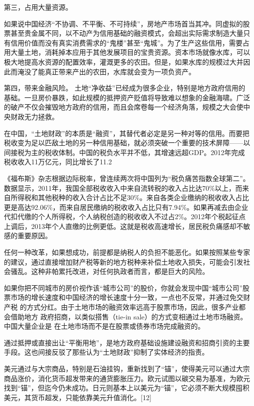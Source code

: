 第三，占用大量资源。

如果说中国经济“不协调、不平衡、不可持续”，房地产市场首当其冲。同虚拟的股票甚至贵金属不同，以不动产为信用基础的融资模式，会超出实际需求制造大量只有信用价值而没有真实消费需求的“鬼楼”甚至“鬼城”。为了生产这些信用，需要占用大量土地，消耗掉本应用于其他发展项目的宝贵资源。资本市场就像水库，可以极大地提高水资源的配置效率，灌溉更多的农田。但是，如果水库的规模过大并因此而淹没了能真正带来产出的农田，水库就会变为一项负资产。

第四，带来金融风险。
土地“净收益”已经成为很多企业，特别是地方政府信用的基础。一旦房价暴跌，如此规模的抵押资产贬值将导致难以想象的金融海啸。广泛的破产不仅会摧毁地方政府的信用，而且会席卷每一个经济角落，规模之大会使中央财政无力拯救。


在中国，“土地财政”的本质是“融资”，其替代者必定是另一种对等的信用。而要把税收变为足以匹敌土地的另一种信用基础，就必须突破一个重要的技术屏障——以间接税为主的税收体制。中国的税负水平并不低，其增速远超GDP。2012年完成税收收入11万亿元，同比增长了11.2%

《福布斯》杂志根据边际税率，曾连续两次将中国列为“税负痛苦指数全球第二”。
数据显示，2011年，我国全部税收收入中来自流转税的收入占比达70\%以上，而来自所得税和其他税种的收入合计占比不足30\%。来自各类企业缴纳的税收收入占比更是高达92.06\%，而来自居民缴纳的税收收入占比只有7.94\%。如果再减去由企业代扣代缴的个人所得税，个人纳税创造的税收收入不过占2\%。2012年个税起征点上调后，2013年个人直缴的比例更低。这就是税收高速增长，居民税负痛感却不敏感的重要原因。

任何一种改革，如果想成功，前提都是纳税人的负担不能恶化。如果按照某些专家的建议，通过直接增加财产税等新的地方税种来补偿土地收入损失，可能会引发社会骚乱。这种非帕累托改进，对任何执政者而言，都是巨大的风险。

如果你把不同城市的房价视作该“城市公司”的股价，你就会发现中国“城市公司”股
票市场的增长速度和中国经济的增长速度十分一致，一点也不反常，并通过免交财产税
的方式分红。由于土地市场的融资效率远高于股票市场，因此，很多产业都会借助地方
政府招商，以类似搭售（tie-in sale）的方式变相通过土地市场融资。中国大量企业是
在土地市场而不是在股票或债券市场完成融资的。

通过抵押或直接出让“平衡用地”，是地方政府基础设施建设融资和招商引资的主要手段。这也间接反驳了那些认为“土地财政”抑制了实体经济的指责。

美元通过与大宗商品，特别是石油挂钩，重新找到了“锚”，使得美元可以通过大宗商品涨价，消化货币超发带来的通货膨胀压力。欧元试图以碳交易为基准，为欧元找到“锚”，但迄今仍未成功。日元则基本上以美元为“锚”，它必须不断大规模囤积美元，其货币超发，只能依靠美元升值消化。[12]

